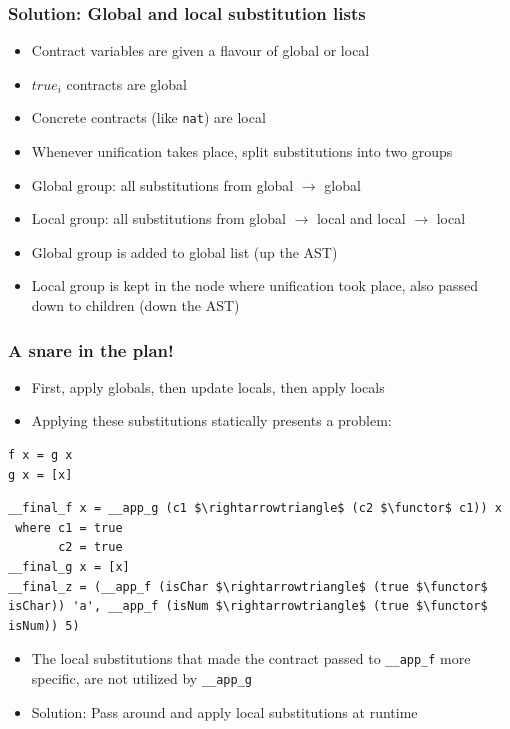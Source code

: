 \documentclass[]{beamer}
\makeatletter
\newcommand{\functor}{<\!\!\!@\!\!\!>}
\makeatother
\begin{document}
\begin{frame}[fragile]
\frametitle{Solution: Global and local substitution lists}

\begin{itemize}
	\item Contract variables are given a flavour of global or local
	\item $true_i$ contracts are global
	\item Concrete contracts (like \texttt{nat}) are local
	\item Whenever unification takes place, split substitutions into two groups
	\item Global group: all substitutions from global $\rightarrow$ global
	\item Local group: all substitutions from global $\rightarrow$ local and local $\rightarrow$ local
	\item Global group is added to global list (up the AST)
	\item Local group is kept in the node where unification took place, also passed down to children (down the AST)
\end{itemize}

\end{frame}

\begin{frame}[fragile]
\frametitle{A snare in the plan!}

\begin{itemize}
	\item First, apply globals, then update locals, then apply locals
	\item Applying these substitutions statically presents a problem:
\end{itemize}

\begin{lstlisting}
f x = g x
g x = [x]
\end{lstlisting}

\begin{lstlisting}[mathescape]
__final_f x = __app_g (c1 $\rightarrowtriangle$ (c2 $\functor$ c1)) x
 where c1 = true
       c2 = true
__final_g x = [x]
__final_z = (__app_f (isChar $\rightarrowtriangle$ (true $\functor$ isChar)) 'a', __app_f (isNum $\rightarrowtriangle$ (true $\functor$ isNum)) 5)
\end{lstlisting}

\begin{itemize}
	\item The local substitutions that made the contract passed to \texttt{\_\_app\_f} more specific, are not utilized by \texttt{\_\_app\_g}
	\item Solution: Pass around and apply local substitutions at runtime
\end{itemize}

\end{frame}
\end{document}
